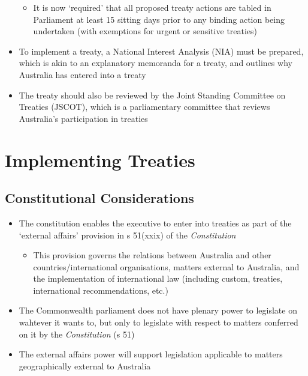 \begin{itemize}
\begin{itemize}
        \item It is now `required' that all proposed treaty actions are tabled in Parliament at least 15 sitting days prior to any binding action being undertaken (with exemptions for urgent or sensitive treaties)
    \end{itemize}
    \item To implement a treaty, a National Interest Analysis (NIA) must be prepared, which is akin to an explanatory memoranda for a treaty, and outlines why Australia has entered into a treaty
    \item The treaty should also be reviewed by the Joint Standing Committee on Treaties (JSCOT), which is a parliamentary committee that reviews Australia's participation in treaties
\end{itemize}

\section{Implementing Treaties}
\subsection{Constitutional Considerations}
\begin{itemize}
    \item The constitution enables the executive to enter into treaties as part of the `external affairs' provision in s 51(xxix) of the \textit{Constitution}
    \begin{itemize}
        \item This provision governs the relations between Australia and other countries/international organisations, matters external to Australia, and the implementation of international law (including custom, treaties, international recommendations, etc.)
    \end{itemize}
    \item The Commonwealth parliament does not have plenary power to legislate on wahtever it wants to, but only to legislate with respect to matters conferred on it by the \textit{Constitution} (s 51)
    \item The external affairs power will support legislation applicable to matters geographically external to Australia
\end{itemize}

